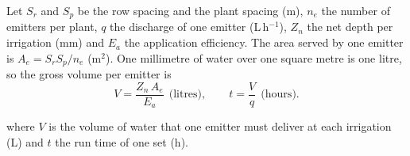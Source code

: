 \par\noindent Let $S_r$ and $S_p$ be the row spacing and the plant spacing (m), $n_e$ the number of emitters per plant, $q$ the discharge of one emitter (L\,h$^{-1}$), $Z_n$ the net depth per irrigation (mm) and $E_a$ the application efficiency. The area served by one emitter is $A_e=S_rS_p/n_e$ (m$^2$). One millimetre of water over one square metre is one litre, so the gross volume per emitter is
\begin{equation}\label{eq:fd-drip-v}\boxed{V=\frac{Z_n\,A_e}{E_a}\ \ \text{(litres)},\qquad t=\frac{V}{q}\ \ \text{(hours)} .}\end{equation}
\par\noindent where $V$ is the volume of water that one emitter must deliver at each irrigation (L) and $t$ the run time of one set (h).

